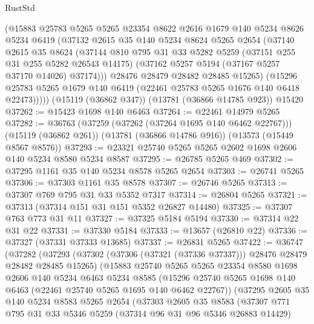 \begin{lexlean}{RustStd}
\begin{coremodule}
        (@15883
          @25783
          @5265
          @5265
          @23354
          @8622
          @2616
          @1679
          @140
          @5234
          @8626
          @5234
          @6419
          (@37132
            @2615
            @35
            @140
            @5234
            @8624
            @5265
            @2654
            (@37140
              @2615
              @35
              @8624
              (@37144
                @810
                @795
                @31
                @33
                @5282
                @5259
                (@37151 @255 @31 @255 @5282 @26543 @14175)
                (@37162 @5257 @5194 (@37167 @5257 @37170 @14026) @37174)))
            @28476
            @28479
            @28482
            @28485
            @15265)
          (@15296 @25783 @5265 @1679 @140 @6419 (@22461 @25783 @5265 @1676 @140 @6418 @22473)))))
    (@15119 (@36862 @347))
    (@13781 (@36866 @14785 @923))
    @15420
@37262 := @15423 @1698 @140 @6463
@37264 := @22461 @14979 @5265
@37282 := @36763
    (@37259 (@37262 (@37264 @1695 @140 @6462 @22767)))
    (@15119 (@36862 @261))
    (@13781 (@36866 @14786 @916))
    (@13573 (@15449 @8567 @8576))
@37293 := @23321 @25740 @5265 @5265 @2602 @1698 @2606 @140 @5234 @8580 @5234 @8587
@37295 := @26785 @5265 @469
@37302 := @37295 @1161 @35 @140 @5234 @8578 @5265 @2654
@37303 := @26741 @5265
@37306 := @37303 @1161 @35 @8578
@37307 := @26746 @5265
@37313 := @37307 @769 @795 @31 @33 @5352 @7317
@37314 := @26804 @5265
@37321 := @37313 (@37314 @151 @31 @151 @5352 @26827 @14480)
@37325 := @37307 @763 @773 @31 @11
@37327 := @37325 @5184 @5194
@37330 := @37314 @22 @31 @22
@37331 := @37330 @5184
@37333 := @13657 (@26810 @22)
@37336 := @37327 (@37331 @37333 @13685)
@37337 := @26831 @5265
@37422 := @36747
    (@37282
      (@37293
        (@37302 (@37306 (@37321 (@37336 @37337))) @28476 @28479 @28482 @28485 @15265)
        (@15883
          @25740
          @5265
          @5265
          @23354
          @8580
          @1698
          @2606
          @140
          @5234
          @6463
          @5234
          @8585
          (@15296 @25740 @5265 @1698 @140 @6463 (@22461 @25740 @5265 @1695 @140 @6462 @22767))
          (@37295
            @2605
            @35
            @140
            @5234
            @8583
            @5265
            @2654
            (@37303
              @2605
              @35
              @8583
              (@37307
                @771
                @795
                @31
                @33
                @5346
                @5259
                (@37314 @96 @31 @96 @5346 @26883 @14429)

\end{coremodule}
\end{lexlean}
